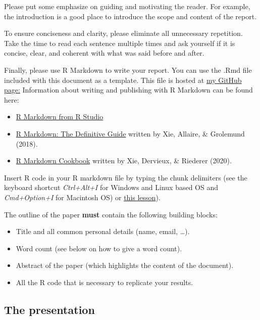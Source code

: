 \documentclass[
  12pt,
]{article}
\providecommand{\tightlist}{%
  \setlength{\itemsep}{0pt}\setlength{\parskip}{0pt}}
\begin{document}
Please put some emphasize on guiding and motivating the reader. For example, the introduction is a good place to introduce the scope and content of the report.

To ensure conciseness and clarity, please eliminate all unnecessary repetition. Take the time to read each sentence multiple times and ask yourself if it is concise, clear, and coherent with what was said before and after.

Finally, please use R Markdown to write your report. You can use the .Rmd file included with this document as a template. This file is hosted at \href{https://github.com/hubchev/courses/tree/main/rmd}{my GitHub page:} Information about writing and publishing with R Markdown can be found here:

\begin{itemize}
\tightlist
\item
  \href{https://rmarkdown.rstudio.com/lesson-1.html}{R Markdown from R Studio}
\item
  \href{https://bookdown.org/yihui/rmarkdown/}{R Markdown: The Definitive Guide} written by Xie, Allaire, \& Grolemund (2018).
\item
  \href{https://bookdown.org/yihui/rmarkdown-cookbook/}{R Markdown Cookbook} written by Xie, Dervieux, \& Riederer (2020).
\end{itemize}

Insert R code in your R markdown file by typing the chunk delimiters (see the keyboard shortcut \emph{Ctrl+Alt+I} for Windows and Linux based OS and \emph{Cmd+Option+I} for Macintosh OS) or \href{https://rmarkdown.rstudio.com/lesson-3.html}{this lesson}).

The outline of the paper \textbf{must} contain the following building blocks:

\begin{itemize}
\tightlist
\item
  Title and all common personal details (name, email, \ldots).
\item
  Word count (see below on how to give a word count).
\item
  Abstract of the paper (which highlights the content of the document).
\item
  All the R code that is necessary to replicate your results.
\end{itemize}

\hypertarget{the-presentation}{%
\subsection{The presentation}\label{the-presentation}}
\end{document}
